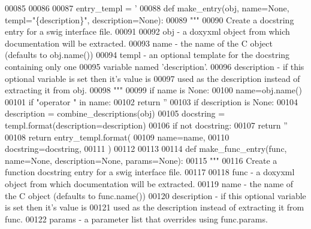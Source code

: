 \begin{DoxyCode}
00085 
00086 
00087 entry\_templ = \textcolor{stringliteral}{'%
00088 \textcolor{keyword}{def }make_entry(obj, name=None, templ="\{description\}", description=None):
00089     \textcolor{stringliteral}{"""}
00090 \textcolor{stringliteral}{    Create a docstring entry for a swig interface file.}
00091 \textcolor{stringliteral}{}
00092 \textcolor{stringliteral}{    obj - a doxyxml object from which documentation will be extracted.}
00093 \textcolor{stringliteral}{    name - the name of the C object (defaults to obj.name())}
00094 \textcolor{stringliteral}{    templ - an optional template for the docstring containing only one}
00095 \textcolor{stringliteral}{            variable named 'description'.}
00096 \textcolor{stringliteral}{    description - if this optional variable is set then it's value is}
00097 \textcolor{stringliteral}{            used as the description instead of extracting it from obj.}
00098 \textcolor{stringliteral}{    """}
00099     \textcolor{keywordflow}{if} name \textcolor{keywordflow}{is} \textcolor{keywordtype}{None}:
00100         name=obj.name()
00101     \textcolor{keywordflow}{if} \textcolor{stringliteral}{"operator "} \textcolor{keywordflow}{in} name:
00102         \textcolor{keywordflow}{return} \textcolor{stringliteral}{''}
00103     \textcolor{keywordflow}{if} description \textcolor{keywordflow}{is} \textcolor{keywordtype}{None}:
00104         description = combine_descriptions(obj)
00105     docstring = templ.format(description=description)
00106     \textcolor{keywordflow}{if} \textcolor{keywordflow}{not} docstring:
00107         \textcolor{keywordflow}{return} \textcolor{stringliteral}{''}
00108     \textcolor{keywordflow}{return} entry\_templ.format(
00109         name=name,
00110         docstring=docstring,
00111         )
00112 
00113 
00114 \textcolor{keyword}{def }make_func_entry(func, name=None, description=None, params=None):
00115     \textcolor{stringliteral}{"""}
00116 \textcolor{stringliteral}{    Create a function docstring entry for a swig interface file.}
00117 \textcolor{stringliteral}{}
00118 \textcolor{stringliteral}{    func - a doxyxml object from which documentation will be extracted.}
00119 \textcolor{stringliteral}{    name - the name of the C object (defaults to func.name())}
00120 \textcolor{stringliteral}{    description - if this optional variable is set then it's value is}
00121 \textcolor{stringliteral}{            used as the description instead of extracting it from func.}
00122 \textcolor{stringliteral}{    params - a parameter list that overrides using func.params.}
}
\end{DoxyCode}
